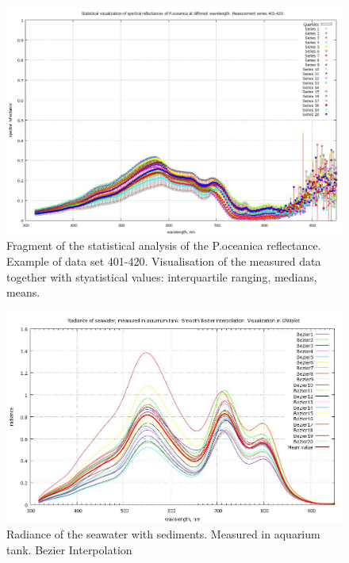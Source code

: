\documentclass[10pt, a4paper]{article}
\begin{document}
\begin{appendices}
\begin{figure}[h]
\begin{center}
\includegraphics[scale=0.20]{GNU-Stat-M-401-420.jpg}
\caption{Fragment of the statistical analysis of the P.oceanica reflectance. Example of data set 401-420. 
Visualisation of the measured data together with styatistical values: interquartile ranging, medians, means.}
\label{fig:46}
\end{center}
\end{figure}
\begin{figure}[H]
\centering
\includegraphics[scale=0.25]{GNU-Radiance_Bezier.jpg}
\caption{Radiance of the seawater with sediments. Measured in 
aquarium tank. Bezier Interpolation}
\label{fig:47}
\end{figure}


\end{appendices}
\end{document}
